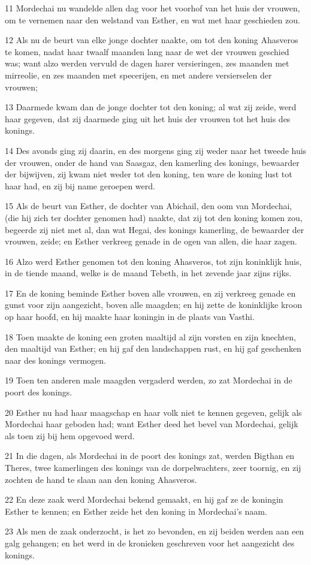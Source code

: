 \par 11 Mordechai nu wandelde allen dag voor het voorhof van het huis der vrouwen, om te vernemen naar den welstand van Esther, en wat met haar geschieden zou.
\par 12 Als nu de beurt van elke jonge dochter naakte, om tot den koning Ahasveros te komen, nadat haar twaalf maanden lang naar de wet der vrouwen geschied was; want alzo werden vervuld de dagen harer versieringen, zes maanden met mirreolie, en zes maanden met specerijen, en met andere versierselen der vrouwen;
\par 13 Daarmede kwam dan de jonge dochter tot den koning; al wat zij zeide, werd haar gegeven, dat zij daarmede ging uit het huis der vrouwen tot het huis des konings.
\par 14 Des avonds ging zij daarin, en des morgens ging zij weder naar het tweede huis der vrouwen, onder de hand van Saasgaz, den kamerling des konings, bewaarder der bijwijven, zij kwam niet weder tot den koning, ten ware de koning lust tot haar had, en zij bij name geroepen werd.
\par 15 Als de beurt van Esther, de dochter van Abichail, den oom van Mordechai, (die hij zich ter dochter genomen had) naakte, dat zij tot den koning komen zou, begeerde zij niet met al, dan wat Hegai, des konings kamerling, de bewaarder der vrouwen, zeide; en Esther verkreeg genade in de ogen van allen, die haar zagen.
\par 16 Alzo werd Esther genomen tot den koning Ahasveros, tot zijn koninklijk huis, in de tiende maand, welke is de maand Tebeth, in het zevende jaar zijns rijks.
\par 17 En de koning beminde Esther boven alle vrouwen, en zij verkreeg genade en gunst voor zijn aangezicht, boven alle maagden; en hij zette de koninklijke kroon op haar hoofd, en hij maakte haar koningin in de plaats van Vasthi.
\par 18 Toen maakte de koning een groten maaltijd al zijn vorsten en zijn knechten, den maaltijd van Esther; en hij gaf den landschappen rust, en hij gaf geschenken naar des konings vermogen.
\par 19 Toen ten anderen male maagden vergaderd werden, zo zat Mordechai in de poort des konings.
\par 20 Esther nu had haar maagschap en haar volk niet te kennen gegeven, gelijk als Mordechai haar geboden had; want Esther deed het bevel van Mordechai, gelijk als toen zij bij hem opgevoed werd.
\par 21 In die dagen, als Mordechai in de poort des konings zat, werden Bigthan en Theres, twee kamerlingen des konings van de dorpelwachters, zeer toornig, en zij zochten de hand te slaan aan den koning Ahasveros.
\par 22 En deze zaak werd Mordechai bekend gemaakt, en hij gaf ze de koningin Esther te kennen; en Esther zeide het den koning in Mordechai's naam.
\par 23 Als men de zaak onderzocht, is het zo bevonden, en zij beiden werden aan een galg gehangen; en het werd in de kronieken geschreven voor het aangezicht des konings.

